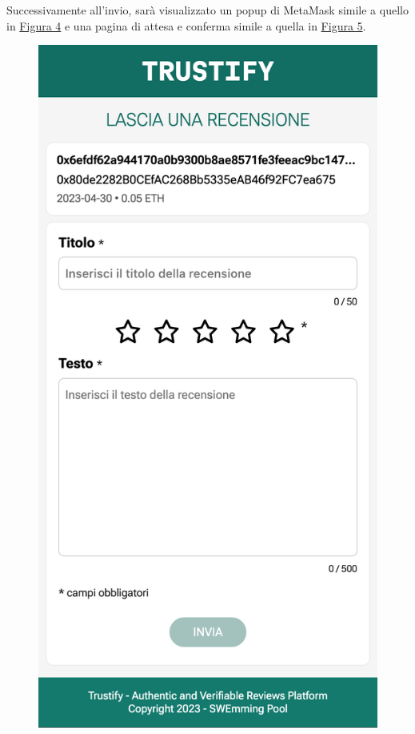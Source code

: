 Successivamente all'invio, sarà visualizzato un popup di MetaMask simile a quello in \hyperref[fig:checkout_metamask]{Figura 4} e una pagina di attesa e conferma simile a quella in \hyperref[fig:checkout_conferma]{Figura 5}.

\begin{figure}
      \includegraphics[width=\linewidth]{src/img/rilascio_recensione.png}

\end{figure}
